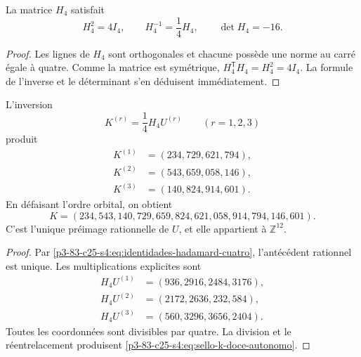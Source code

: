 \begin{lemma}
\label{p3-83-c25-s4:lem:cuarto-inversa-hadamard}
La matrice \(H_4\) satisfait
\begin{equation}
 H_4^2=4I_4,
 \qquad
 H_4^{-1}=\frac14H_4,
 \qquad
 \det H_4=-16.
 \label{p3-83-c25-s4:eq:identidades-hadamard-cuatro}
\end{equation}
\end{lemma}

\begin{proof}
Les lignes de \(H_4\) sont orthogonales et chacune possède une norme au carré égale à quatre.
Comme la matrice est symétrique, \(H_4^{\mathsf T}H_4=H_4^2=4I_4\). La
formule de l’inverse et le déterminant s’en déduisent immédiatement.
\end{proof}

\begin{theorem}
\label{p3-83-c25-s4:thm:reconstruccion-entera-k-hadamard}
L’inversion
\begin{equation}
 K^{(r)}=\frac14H_4U^{(r)}
 \qquad(r=1,2,3)
 \label{p3-83-c25-s4:eq:inversion-bloques-hadamard}
\end{equation}
produit
\begin{align*}
 K^{(1)}&=(234,729,621,794),\\
 K^{(2)}&=(543,659,058,146),\\
 K^{(3)}&=(140,824,914,601).
\end{align*}
En défaisant l’ordre orbital, on obtient
\begin{equation}
 \boxed{
 K=(234,543,140,729,659,824,621,058,914,794,146,601).}
 \label{p3-83-c25-s4:eq:sello-k-doce-autonomo}
\end{equation}
C'est l'unique préimage rationnelle de \(U\), et elle appartient à \(\mathbb Z^{12}\).
\end{theorem}

\begin{proof}
Par \eqref{p3-83-c25-s4:eq:identidades-hadamard-cuatro}, l’antécédent rationnel est unique.
Les multiplications explicites sont
\begin{align*}
 H_4U^{(1)}&=(936,2916,2484,3176),\\
 H_4U^{(2)}&=(2172,2636,232,584),\\
 H_4U^{(3)}&=(560,3296,3656,2404).
\end{align*}
Toutes les coordonnées sont divisibles par quatre. La division et le réentrelacement
produisent \eqref{p3-83-c25-s4:eq:sello-k-doce-autonomo}.
\end{proof}

